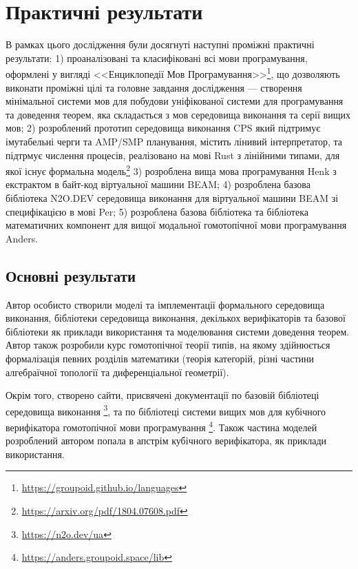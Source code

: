 \newpage
\section{Практичні результати}
В рамках цього дослідження були досягнуті наступні проміжні практичні результати:
1) проаналізовані та класифіковані всі мови програмування, оформлені у вигляді
   <<Енциклопедії Мов Програмування>>\footnote{\url{https://groupoid.github.io/languages}},
   що дозволяють виконати проміжні цілі та головне завдання дослідження --- створення
   мінімальної системи мов для побудови уніфікованої системи для програмування та доведення теорем,
   яка складається з мов середовища виконання та серії вищих мов;
2) розроблений прототип середовища виконання CPS який підтримує імутабельні черги
   та AMP/SMP планування, містить лінивий інтерпретатор, та підтрмує числення процесів,
   реалізовано на мові Rust з лінійними типами,
   для якої існує формальна модель\footnote{\url{https://arxiv.org/pdf/1804.07608.pdf}}
3) розроблена вища мова програмування Henk з екстрактом в байт-код віртуальної машини BEAM;
4) розроблена базова бібліотека N2O.DEV середовища виконання
   для віртуальної машини BEAM зі специфікацією в мові Per;
5) розроблена базова бібліотека та бібліотека математичних компонент для вищої модальної
   гомотопічної мови програмування Anders.

\subsection{Основні результати}
Автор особисто створили моделі та імплементації формального середовища виконання,
бібліотеки середовища виконання, декількох верифікаторів та базової бібліотеки
як приклади використання та моделювання системи доведення теорем. Автор також
розробили курс гомотопічної теорії типів, на якому здійнюється формалізація
певних розділів математики (теорія категорій, різні частини алгебраїчної
топології та диференціальної геометрії).

Окрім того, створено сайти, присвячені документації по базовій бібліотеці
середовища виконання \footnote{\url{https://n2o.dev/ua}},
та по бібліотеці системи вищих мов для кубічного верифікатора гомотопічної
мови програмування \footnote{\url{https://anders.groupoid.space/lib}}. Також частина
моделей розроблений автором попала в апстрім кубічного верифікатора,
як приклади використання.

\newpage
